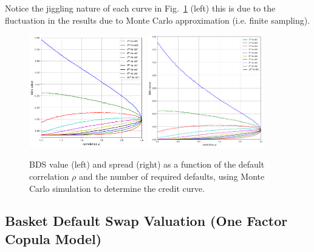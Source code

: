 Notice the jiggling nature of each curve in Fig.~\ref{fig:bds_value_mc} (left) this is due to the fluctuation in the results due to Monte Carlo approximation (i.e. finite sampling).

\begin{figure}[htb]
\centering
\includegraphics[width=0.45\textwidth]{figures/bds_value_mc}
\quad
\includegraphics[width=0.45\textwidth]{figures/bds_spread_mc}
\caption{BDS value (left) and spread (right) as a function of the default correlation $\rho$ and the number of required defaults, using Monte Carlo simulation to determine the credit curve.}
\label{fig:bds_value_mc}
\end{figure}

\subsection{Basket Default Swap Valuation (One Factor Copula Model)}
\label{basket-cds-valuation-under-market-standard-model}

